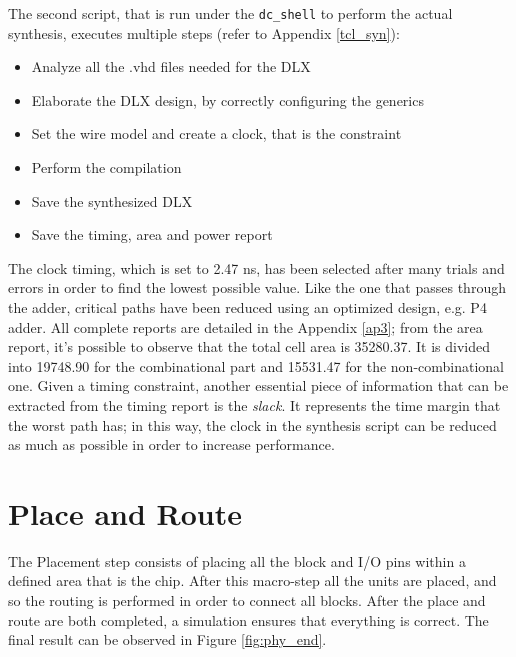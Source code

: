 The second script, that is run under the \texttt{dc\_shell} to perform the actual synthesis, executes multiple steps (refer to Appendix \ref{tcl_syn}):
\begin{itemize}
    \itemsep0sp
    \item Analyze all the .vhd files needed for the DLX
    \item Elaborate the DLX design, by correctly configuring the generics
    \item Set the wire model and create a clock, that is the constraint
    \item Perform the compilation
    \item Save the synthesized DLX
    \item Save the timing, area and power report 
\end{itemize}
The clock timing, which is set to 2.47 ns, has been selected after many trials and errors in order to find the lowest possible value. Like the one that passes through the adder, critical paths have been reduced using an optimized design, e.g. P4 adder.\newline\newline
All complete reports are detailed in the Appendix \ref{ap3}; from the area report, it's possible to observe that the total cell area is 35280.37. It is divided into 19748.90 for the combinational part and 15531.47 for the non-combinational one.\newline\newline
Given a timing constraint, another essential piece of information that can be extracted from the timing report is the \textit{slack}. It represents the time margin that the worst path has; in this way, the clock in the synthesis script can be reduced as much as possible in order to increase performance.

\section{Place and Route}
The Placement step consists of placing all the block and I/O pins within a defined area that is the chip. After this macro-step all the units are placed, and so the routing is performed in order to connect all blocks. After the place and route are both completed, a simulation ensures that everything is correct. The final result can be observed in Figure \ref{fig:phy_end}.


